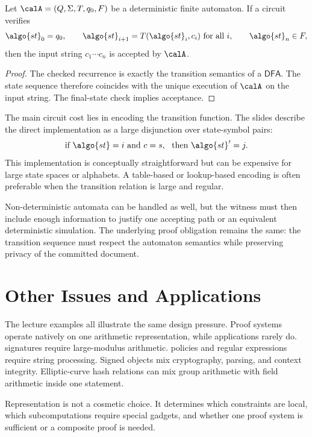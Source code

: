 \documentclass[11pt]{article}
\newcommand{\DFA}{\ensuremath{\mathsf{DFA}}}
\begin{document}
\begin{proposition}
Let $\calA=(Q,\Sigma,T,q_0,F)$ be a deterministic finite automaton.  If a
circuit verifies
\[
  \algo{st}_0=q_0,
  \qquad
  \algo{st}_{i+1}=T(\algo{st}_i,c_i)
  \text{ for all } i,
  \qquad
  \algo{st}_n \in F,
\]
then the input string $c_1\cdots c_n$ is accepted by $\calA$.
\end{proposition}

\begin{proof}
The checked recurrence is exactly the transition semantics of a \DFA.  The
state sequence therefore coincides with the unique execution of $\calA$ on the
input string.  The final-state check implies acceptance.
\end{proof}

The main circuit cost lies in encoding the transition function.  The slides
describe the direct implementation as a large disjunction over state-symbol
pairs:
\[
  \text{if } \algo{st}=i \text{ and } c=s,\ \text{ then } \algo{st}'=j.
\]
This implementation is conceptually straightforward but can be expensive for
large state spaces or alphabets.  A table-based or lookup-based encoding is
often preferable when the transition relation is large and regular.

Non-deterministic automata can be handled as well, but the witness must then
include enough information to justify one accepting path or an equivalent
deterministic simulation.  The underlying proof obligation remains the same:
the transition sequence must respect the automaton semantics while preserving
privacy of the committed document.

\section{Other Issues and Applications}

The lecture examples all illustrate the same design pressure.  Proof systems
operate natively on one arithmetic representation, while applications rarely do.
 signatures require large-modulus arithmetic.   policies and
regular expressions require string processing.  Signed  objects mix
cryptography, parsing, and context integrity.  Elliptic-curve hash relations can
mix group arithmetic with field arithmetic inside one statement.

\begin{remark}
Representation is not a cosmetic choice.  It determines which constraints are
local, which subcomputations require special gadgets, and whether one proof
system is sufficient or a composite proof is needed.
\end{remark}
\end{document}
